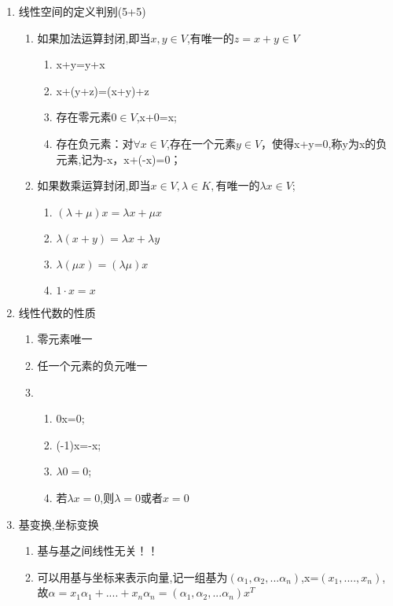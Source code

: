 \documentclass[11pt, a4paper, UTF8]{ctexart}
\begin{document}
\begin{solution}
  \begin{enumerate}
    \item 线性空间的定义判别(5+5)
    \begin{enumerate}
      \item 如果加法运算封闭,即当$x,y\in V$,有唯一的$z=x+y\in V$
      \begin{enumerate}
        \item x+y=y+x
        \item x+(y+z)=(x+y)+z
        \item 存在零元素$0\in V$,x+0=x;
        \item 存在负元素：对$\forall x \in V$,存在一个元素$y\in V$，使得x+y=0,称y为x的负元素,记为-x，x+(-x)=0；
      \end{enumerate}
      \item 如果数乘运算封闭,即当$x\in V,\lambda \in K,$有唯一的$\lambda x\in V$;
        \begin{enumerate}
          \item $(\lambda+\mu)x=\lambda x +\mu x$
          \item $\lambda(x+y)=\lambda x+\lambda y$
          \item $\lambda (\mu x)=(\lambda \mu)x$
          \item $1\cdot x=x$
        \end{enumerate}
    \end{enumerate}
    \item 线性代数的性质
    \begin{enumerate}
      \item 零元素唯一
      \item 任一个元素的负元唯一
      \item 
        \begin{enumerate}
          \item 0x=0;
          \item (-1)x=-x;
          \item $\lambda 0=0$;
          \item 若$\lambda x=0$,则$\lambda =0 $或者$x=0$
        \end{enumerate}
    \end{enumerate}
    \item 基变换,坐标变换
    \begin{enumerate}
      \item 基与基之间线性无关！！
      \item 可以用基与坐标来表示向量,记一组基为$(\alpha _1 ,\alpha _2,...\alpha _n)$,x=$(x_1,....,x_n)$,故$\alpha = x_1\alpha _1+....+x_n \alpha _n=(\alpha _1 ,\alpha _2,...\alpha _n)x^{T}$

\end{enumerate}
\end{enumerate}
\end{solution}
\end{document}
